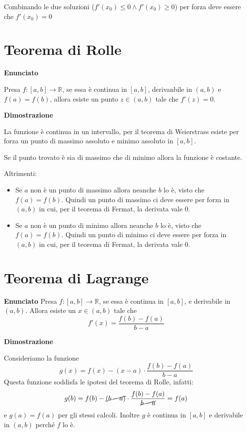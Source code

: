 Combinando le due soluzioni ($f'(x_0)\leq 0 \land f'(x_0)\geq 0$) per forza deve essere che $f'(x_0)=0$


\section{Teorema di Rolle}

\textbf{Enunciato}

Presa $f: [a,b] \to \mathbb{R}$, se essa è continua in $[a,b]$, derivanbile in $(a,b)$ e $f(a)=f(b)$, allora esiste un punto $z \in (a,b)$ tale che $f'(z)=0$.

\textbf{Dimostrazione}

La funzione è continua in un intervallo, per il teorema di Weierstrass esiste per forza un punto di massimo assoluto e minimo assoluto in $[a,b]$.   

Se il punto trovato è sia di massimo che di minimo allora la funzione è costante.

Altrimenti:

\begin{itemize}
\item Se $a$ non è un punto di massimo allora neanche $b$ lo è, visto che $f(a)=f(b)$. Quindi un punto di massimo ci deve essere per forza in $(a,b)$ in cui, per il teorema di Fermat, la derivata vale 0.

\item Se $a$ non è un punto di minimo allora neanche $b$ lo è, visto che $f(a)=f(b)$. Quindi un punto di minimo ci deve essere per forza in $(a,b)$ in cui, per il teorema di Fermat, la derivata vale 0.
\end{itemize}


\section{Teorema di Lagrange}

\textbf{Enunciato}
Presa $f: [a,b] \to \mathbb{R}$, se essa è continua in $[a,b]$, e derivabile in $(a,b)$. Allora esiste un $x \in (a,b)$ tale che $$f'(x)=\frac{f(b)-f(a)}{b-a}$$

\textbf{Dimostrazione}

Consideriamo la funzione
\begin{equation*}
g(x) = f(x) - (x-a) \cdot \frac{f(b)-f(a)}{b-a}
\end{equation*}
Questa funzione soddisfa le ipotesi del teorema di Rolle, infatti:
\begin{equation*}
g(b) = f(b) - \cancel{(b-a)} \cdot \frac{f(b)-f(a)}{\cancel{b-a}} = f(a)
\end{equation*} 
e $g(a) = f(a)$ per gli stessi calcoli. Inoltre $g$ è continua in $[a,b]$ e derivabile in $(a,b)$ perché $f$ lo è.

